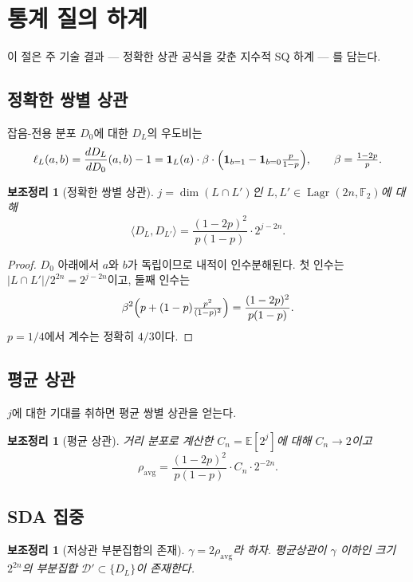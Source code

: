 \documentclass[11pt,a4paper]{article}
\theoremstyle{plain}
\newtheorem{lemma}[theorem]{보조정리}
\theoremstyle{definition}
\newcommand{\F}{\mathbb{F}}
\newcommand{\E}{\mathbb{E}}
\DeclareMathOperator{\Lagr}{Lagr}
\begin{document}
\section{통계 질의 하계}
\label{sec:sq-ko}

이 절은 주 기술 결과 --- 정확한 상관 공식을 갖춘 지수적 SQ 하계 --- 를 담는다.

\subsection{정확한 쌍별 상관}

잡음-전용 분포 $D_0$에 대한 $D_L$의 우도비는
\[
\ell_L(a,b) = \frac{dD_L}{dD_0}(a,b) - 1 = \mathbf{1}_L(a)\cdot\beta\cdot\Bigl(\mathbf{1}_{b=1} - \mathbf{1}_{b=0}\tfrac{p}{1-p}\Bigr), \qquad \beta = \tfrac{1-2p}{p}.
\]

\begin{lemma}[정확한 쌍별 상관]
\label{lem:exact-corr-ko}
$j = \dim(L\cap L')$인 $L, L' \in \Lagr(2n,\F_2)$에 대해
\[
\langle D_L, D_{L'}\rangle = \frac{(1-2p)^2}{p(1-p)}\cdot 2^{j-2n}.
\]
\end{lemma}

\begin{proof}
$D_0$ 아래에서 $a$와 $b$가 독립이므로 내적이 인수분해된다. 첫 인수는 $|L\cap L'|/2^{2n} = 2^{j-2n}$이고, 둘째 인수는
\[
\beta^2\Bigl(p + (1-p)\tfrac{p^2}{(1-p)^2}\Bigr) = \frac{(1-2p)^2}{p(1-p)}.
\]
$p=1/4$에서 계수는 정확히 $4/3$이다.
\end{proof}

\subsection{평균 상관}

$j$에 대한 기대를 취하면 평균 쌍별 상관을 얻는다.

\begin{lemma}[평균 상관]
거리 분포로 계산한 $C_n = \E[2^j]$에 대해 $C_n \to 2$이고
\[
\rho_{\mathrm{avg}} = \frac{(1-2p)^2}{p(1-p)}\cdot C_n \cdot 2^{-2n}.
\]
\end{lemma}

\subsection{SDA 집중}

\begin{lemma}[저상관 부분집합의 존재]
$\gamma = 2\rho_{\mathrm{avg}}$라 하자. 평균상관이 $\gamma$ 이하인 크기 $2^{2n}$의 부분집합 $\mathcal{D}' \subset \{D_L\}$이 존재한다.
\end{lemma}
\end{document}
